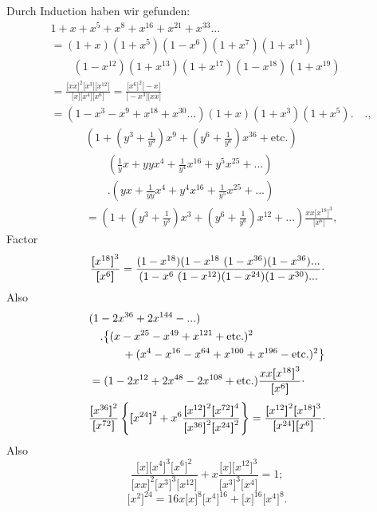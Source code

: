 \begingroup
\newcommand{\TransBracket}[1]{\boldsymbol{[}#1\boldsymbol{]}}
\noindent{\small[S. 44]}\par
\par\indent Durch Induction haben wir gefunden:
\[\begin{aligned}
&1+x+x^5+x^8+x^{16}+x^{21}+x^{33}{.}{.}{.}\\
&=(1+x)(1+x^5)(1-x^6)(1+x^7)(1+x^{11})\\
&\qquad(1-x^{12})(1+x^{13})(1+x^{17})(1-x^{18})(1+x^{19})\\
&=\frac{\TransBracket{xx}^2\TransBracket{x^3}\TransBracket{x^{12}}}{\TransBracket{x}\TransBracket{x^4}\TransBracket{x^6}}
=\frac{\TransBracket{x^6}^2\TransBracket{-x}}{\TransBracket{-x^3}\TransBracket{xx}}\\
&=(1-x^3-x^9+x^{18}+x^{30}{.}{.}{.})(1+x)(1+x^3)(1+x^5){.}\quad{.},
\end{aligned}\]
\[\begin{aligned}
&\left(1+\left(y^3+\frac1{y^3}\right)x^9+\left(y^6+\frac1{y^6}\right)x^{36}+\text{etc.}\right)\\
&\qquad\left(\frac1y x+yyx^4+\frac1{y^4}x^{16}+y^5x^{25}+{.}{.}{.}\right)\\
&\qquad.\left(yx+\frac1{yy}x^4+y^4x^{16}+\frac1{y^5}x^{25}+{.}{.}{.}\right)\\
&=\left(1+\left(y^3+\frac1{y^3}\right)x^3+\left(y^6+\frac1{y^6}\right)x^{12}+{.}{.}{.}\right)
\frac{xx\TransBracket{x^{18}}^3}{\TransBracket{x^6}},
\end{aligned}\]
\noindent Factor
\[\frac{\TransBracket{x^{18}}^3}{\TransBracket{x^6}}
=\frac{(1-x^{18})(1-x^{18}\ (1-x^{36})(1-x^{36}){.}{.}{.}}
{(1-x^6\ (1-x^{12})(1-x^{24})(1-x^{30}){.}{.}{.}}\mathpunct{\raisebox{.5ex}{.}}\]
\noindent Also
\[\begin{aligned}
&(1-2x^{36}+2x^{144}-{.}{.}{.})\\
&\quad.\bigl\{(x-x^{25}-x^{49}+x^{121}+\text{etc.})^2\\
&\qquad\quad+(x^4-x^{16}-x^{64}+x^{100}+x^{196}-\text{etc.})^2\bigr\}\\
&=(1-2x^{12}+2x^{48}-2x^{108}+\text{etc.})\frac{xx\TransBracket{x^{18}}^3}{\TransBracket{x^6}}\mathpunct{\raisebox{.5ex}{.}}
\end{aligned}\]
\[\frac{\TransBracket{x^{36}}^2}{\TransBracket{x^{72}}}
\left\{\TransBracket{x^{24}}^2+x^6\frac{\TransBracket{x^{12}}^2\TransBracket{x^{72}}^4}{\TransBracket{x^{36}}^2\TransBracket{x^{24}}^2}\right\}
=\frac{\TransBracket{x^{12}}^2\TransBracket{x^{18}}^3}{\TransBracket{x^{24}}\TransBracket{x^6}}\mathpunct{\raisebox{.5ex}{.}}\]
\noindent Also
\[\frac{\TransBracket{x}\TransBracket{x^4}^3\TransBracket{x^6}^2}{\TransBracket{xx}^2\TransBracket{x^3}^3\TransBracket{x^{12}}}
+x\frac{\TransBracket{x}\TransBracket{x^{12}}^3}{\TransBracket{x^3}^3\TransBracket{x^4}}=1;\]
\[\TransBracket{x^2}^{24}=16x\TransBracket{x}^8\TransBracket{x^4}^{16}+\TransBracket{x}^{16}\TransBracket{x^4}^8.\]
\clearpage
\endgroup
